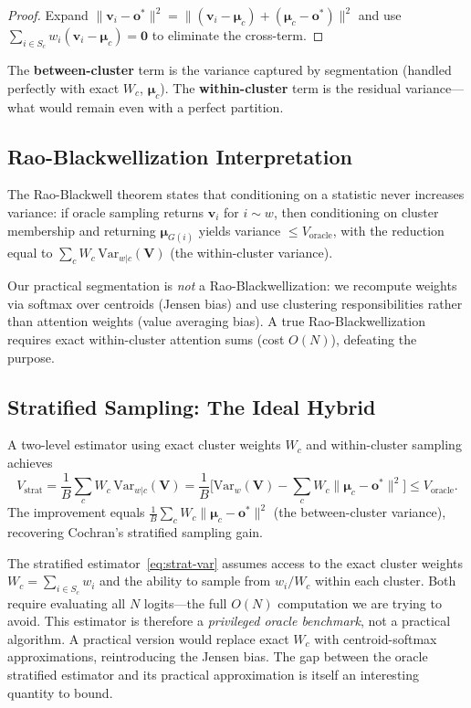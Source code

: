 \documentclass[11pt,a4paper]{article}
\theoremstyle{definition}
\newcommand{\vv}{\mathbf{v}}
\newcommand{\oo}{\mathbf{o}}
\newcommand{\bmu}{\boldsymbol{\mu}}
\newcommand{\Var}{\mathrm{Var}}
\begin{document}
\begin{proof}
Expand $\|\vv_i-\oo^*\|^2 = \|(\vv_i-\bmu_c)+(\bmu_c-\oo^*)\|^2$ and use
$\sum_{i\in S_c}w_i(\vv_i-\bmu_c)=\mathbf{0}$ to eliminate the cross-term.
\end{proof}

The \textbf{between-cluster} term is the variance captured by segmentation
(handled perfectly with exact $W_c$, $\bmu_c$).  The \textbf{within-cluster}
term is the residual variance---what would remain even with a perfect
partition.

\subsection{Rao-Blackwellization Interpretation}

The Rao-Blackwell theorem states that conditioning on a statistic never
increases variance: if oracle sampling returns $\vv_i$ for $i\sim w$, then
conditioning on cluster membership and returning $\bmu_{G(i)}$ yields
variance $\le V_{\mathrm{oracle}}$, with the reduction equal to
$\sum_c W_c\,\Var_{w|c}(\mathbf{V})$ (the within-cluster variance).

Our practical segmentation is \emph{not} a Rao-Blackwellization:
we recompute weights via softmax over centroids (Jensen bias) and use
clustering responsibilities rather than attention weights (value averaging
bias).  A true Rao-Blackwellization requires exact within-cluster attention
sums (cost $O(N)$), defeating the purpose.

\subsection{Stratified Sampling: The Ideal Hybrid}

A two-level estimator using exact cluster weights $W_c$ and within-cluster
sampling achieves
\begin{equation}\label{eq:strat-var}
  V_{\mathrm{strat}}
  = \frac{1}{B}\sum_c W_c\,\Var_{w|c}(\mathbf{V})
  = \frac{1}{B}\bigl[\Var_w(\mathbf{V})
    - \textstyle\sum_c W_c\|\bmu_c-\oo^*\|^2\bigr]
  \le V_{\mathrm{oracle}}.
\end{equation}
The improvement equals $\frac{1}{B}\sum_c W_c\|\bmu_c-\oo^*\|^2$ (the
between-cluster variance), recovering Cochran's stratified sampling gain.

\begin{researchnote}
The stratified estimator~\eqref{eq:strat-var} assumes access to the exact
cluster weights $W_c = \sum_{i\in S_c}w_i$ and the ability to sample from
$w_i/W_c$ within each cluster.  Both require evaluating all $N$ logits---the
full $O(N)$ computation we are trying to avoid.  This estimator is therefore a
\emph{privileged oracle benchmark}, not a practical algorithm.  A practical
version would replace exact $W_c$ with centroid-softmax approximations,
reintroducing the Jensen bias.  The gap between the oracle stratified
estimator and its practical approximation is itself an interesting quantity to
bound.
\end{researchnote}
\end{document}
